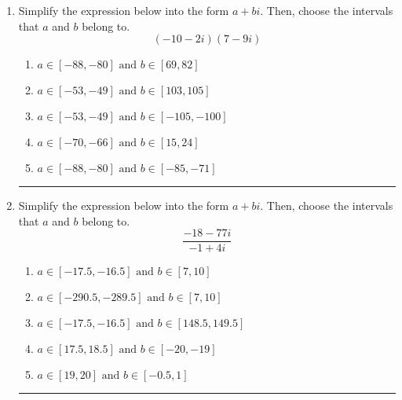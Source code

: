 \documentclass[14pt]{extbook}
\newcommand{\litem}[1]{\item#1\hspace*{-1cm}\rule{\textwidth}{0.4pt}}
\begin{document}
\begin{enumerate}
{\begin{enumerate}[label=\Alph*.]
\end{enumerate} }
\litem{
Simplify the expression below into the form $a+bi$. Then, choose the intervals that $a$ and $b$ belong to.\[ (-10 - 2 i)(7 - 9 i) \]\begin{enumerate}[label=\Alph*.]
\item \( a \in [-88, -80] \text{ and } b \in [69, 82] \)
\item \( a \in [-53, -49] \text{ and } b \in [103, 105] \)
\item \( a \in [-53, -49] \text{ and } b \in [-105, -100] \)
\item \( a \in [-70, -66] \text{ and } b \in [15, 24] \)
\item \( a \in [-88, -80] \text{ and } b \in [-85, -71] \)

\end{enumerate} }
\litem{
Simplify the expression below into the form $a+bi$. Then, choose the intervals that $a$ and $b$ belong to.\[ \frac{-18 - 77 i}{-1 + 4 i} \]\begin{enumerate}[label=\Alph*.]
\item \( a \in [-17.5, -16.5] \text{ and } b \in [7, 10] \)
\item \( a \in [-290.5, -289.5] \text{ and } b \in [7, 10] \)
\item \( a \in [-17.5, -16.5] \text{ and } b \in [148.5, 149.5] \)
\item \( a \in [17.5, 18.5] \text{ and } b \in [-20, -19] \)
\item \( a \in [19, 20] \text{ and } b \in [-0.5, 1] \)

\end{enumerate} }
\end{enumerate}
\end{document}
